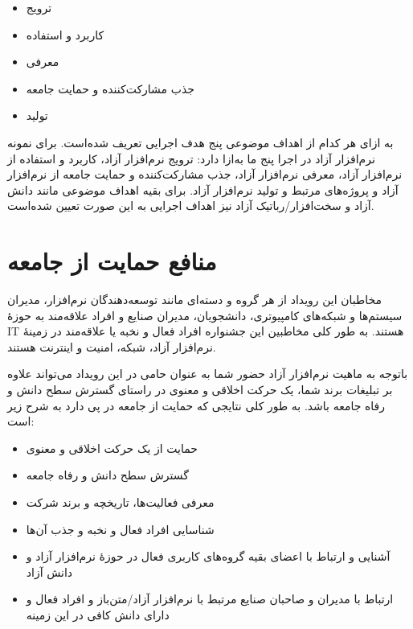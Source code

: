 \documentclass{article}
\begin{document}
\begin{flushright}
\begin{itemize}
\item ترویج
\item کاربرد و استفاده
\item معرفی
\item جذب مشارکت‌کننده و حمایت جامعه
\item تولید
\end{itemize}
\end{flushright}

به ازای هر کدام از اهداف موضوعی پنج هدف اجرایی تعریف شده‌است. برای نمونه نرم‌افزار آزاد در اجرا پنج ما به‌ازا دارد: ترویج نرم‌افزار آزاد، کاربرد و استفاده از نرم‌افزار آزاد، معرفی نرم‌افزار آزاد، جذب مشارکت‌کننده و حمایت جامعه از نرم‌افزار آزاد و پروژه‌های مرتبط و تولید نرم‌افزار آزاد. برای بقیه اهداف موضوعی مانند دانش آزاد و سخت‌افزار/رباتیک آزاد نیز اهداف اجرایی به این صورت تعیین شده‌است.

\section{منافع حمایت از جامعه}
مخاطبان این رویداد از هر گروه و دسته‌ای مانند توسعه‌دهندگان نرم‌افزار، مدیران سیستم‌ها و شبکه‌های کامپیوتری، دانشجویان، مدیران صنایع و افراد علاقه‌مند به حوزهٔ IT  هستند. به طور کلی مخاطبین این جشنواره افراد فعال و نخبه یا علاقه‌مند در زمینهٔ نرم‌افزار آزاد، شبکه، امنیت و اینترنت هستند.

\begin{flushright}

باتوجه به ماهیت نرم‌افزار آزاد حضور شما به عنوان حامی در این رویداد می‌تواند علاوه‌ بر تبلیغات برند شما، یک حرکت اخلاقی و معنوی در راستای گسترش سطح دانش و رفاه جامعه باشد. به طور کلی نتایجی که حمایت از جامعه در پی دارد به شرح زیر است:

\begin{itemize}
\item حمایت از یک حرکت اخلاقی و معنوی
\item گسترش سطح دانش و رفاه جامعه
\item معرفی فعالیت‌ها، تاریخچه و برند شرکت
\item شناسایی افراد فعال و نخبه و جذب آن‌ها
\item آشنایی و ارتباط با اعضای بقیه گروه‌های کاربری فعال در حوزهٔ نرم‌افزار آزاد و دانش آزاد
\item ارتباط با مدیران و صاحبان صنایع مرتبط با نرم‌افزار آزاد/متن‌باز و افراد فعال و دارای دانش کافی در این زمینه
\end{itemize}

\end{flushright}
\end{document}
